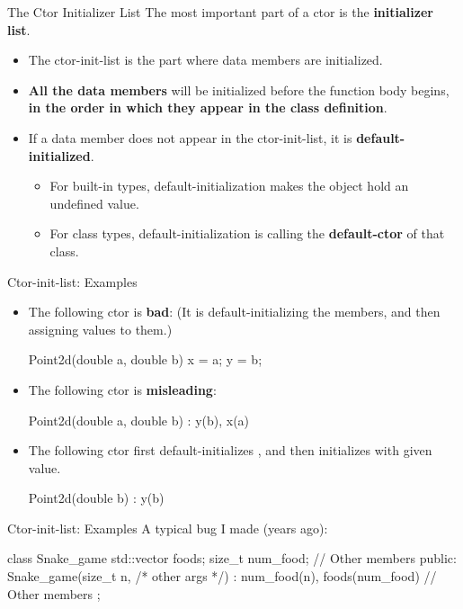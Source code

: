 \documentclass{beamer}
\begin{document}
\begin{frame}{The Ctor Initializer List}
    The most important part of a ctor is the \textbf{initializer list}.
    \begin{itemize}
        \item The ctor-init-list is the part where data members are initialized.
        \item \textbf{All the data members} will be initialized before the function body begins, \textbf{in the order in which they appear in the class definition}.
        \item If a data member does not appear in the ctor-init-list, it is \textbf{default-initialized}.
        \begin{itemize}
            \item For built-in types, default-initialization makes the object hold an undefined value.
            \item For class types, default-initialization is calling the \textbf{default-ctor} of that class.
        \end{itemize}
    \end{itemize}
\end{frame}

\begin{frame}[fragile]{Ctor-init-list: Examples}
    \begin{itemize}
        \item The following ctor is \textbf{bad}: (It is default-initializing the members, and then assigning values to them.)
        \begin{cpp}
Point2d(double a, double b) {
  x = a;
  y = b;
}
        \end{cpp}
        \item The following ctor is \textbf{misleading}:
        \begin{cpp}
Point2d(double a, double b) : y(b), x(a) {}
        \end{cpp}
        \item The following ctor first default-initializes , and then initializes  with given value.
        \begin{cpp}
Point2d(double b) : y(b) {}
        \end{cpp}
    \end{itemize}
\end{frame}

\begin{frame}[fragile]{Ctor-init-list: Examples}
    A typical bug I made (years ago):
    \begin{cpp}
class Snake_game {
  std::vector foods;
  size_t num_food;
  // Other members
 public:
  Snake_game(size_t n, /* other args */)
    : num_food(n), foods(num_food) {}
  // Other members
};
    \end{cpp}
\end{frame}
\end{document}
